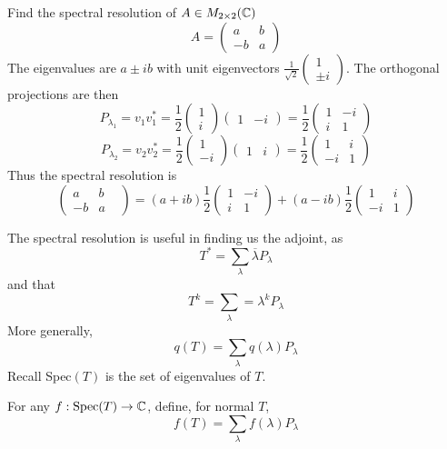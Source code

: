 \documentclass[12pt]{article}
\begin{document}
\begin{ex}
	Find the spectral resolution of $A \in M_{2\times2}(\mathbb{C})$
	$$A = \begin{pmatrix} a & b \\ -b & a \end{pmatrix}$$
	The eigenvalues are $a\pm ib$ with unit eigenvectors $\frac{1}{\sqrt{2}}\begin{pmatrix} 1 \\ \pm i \end{pmatrix}$. The orthogonal projections are then
	$$P_{\lambda_1} = v_1v_1^* = \frac{1}{2}\begin{pmatrix} 1 \\ i \end{pmatrix} \begin{pmatrix} 1 & -i \end{pmatrix} = \frac{1}{2} \begin{pmatrix} 1 & -i \\ i & 1 \end{pmatrix}$$
	$$P_{\lambda_2} = v_2v_2^* = \frac{1}{2} \begin{pmatrix} 1 \\ -i \end{pmatrix} \begin{pmatrix} 1 & i \end{pmatrix} = \frac{1}{2} \begin{pmatrix} 1 & i \\ -i & 1 \end{pmatrix}$$
	Thus the spectral resolution is
	$$\begin{pmatrix} a & b & \\ -b & a \end{pmatrix} = (a+ib)\frac{1}{2}\begin{pmatrix} 1 & -i \\ i & 1 \end{pmatrix} + (a-ib)\frac{1}{2}\begin{pmatrix} 1 & i \\ -i & 1 \end{pmatrix}$$
\end{ex}

The spectral resolution is useful in finding us the adjoint, as
$$T^* = \sum_\lambda \overline{\lambda}P_\lambda$$
and that
$$T^k = \sum_\lambda = \lambda^k P_\lambda$$
More generally,
$$q(T) = \sum_\lambda q(\lambda) P_\lambda$$
Recall Spec$(T)$ is the set of eigenvalues of $T$.

\begin{defn}
	For any $f: \text{Spec}(T) \rightarrow \mathbb{C}$, define, for normal $T$,
	$$f(T) = \sum_\lambda f(\lambda)P_\lambda$$
\end{defn}
\end{document}
